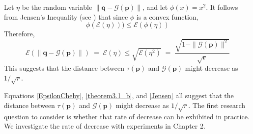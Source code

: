 \begin{itemize}
{Let $\eta$ be the random variable $\| \bm{q} - \mathcal{G}(\bm{p}) \|$, and let $\phi (x) = x^2$. 
It follows from Jensen's Inequality (see \cite{JensenInequality}) that 
since $\phi$ is a convex function, 
\[
\phi(\mathcal{E}(\eta))) \leq \mathcal{E}(\phi(\eta)) 
\]
Therefore,
\begin{equation}
\label{Jensen}
\mathcal{E}(\| \bm{q} - \mathcal{G}(\bm{p}) \|) \;=\; \mathcal{E}(\eta) \leq \sqrt{\mathcal{E}(\eta^2)} \;=\; \frac{\sqrt{1 - \|\mathcal{G}(\bm{p})\|^2}}{\sqrt{\bm{r}}}
\end{equation}
This suggests that the distance between $\tau (\bm{p})$ and $\mathcal{G}(\bm{p})$ might decrease as $1/\sqrt{r}$. 

Equations \ref{EpsilonCheby}, \ref{theorem3.1_b}, and \ref{Jensen} all suggest that the 
distance between $\tau(\bm{p})$ and $\mathcal{G}(\bm{p})$ might decrease as $1/\sqrt{r}$. 
The first research question to consider is whether that rate of decrease can be exhibited 
in practice. We investigate the rate of decrease with experiments in Chapter 2.
}


\end{itemize}
